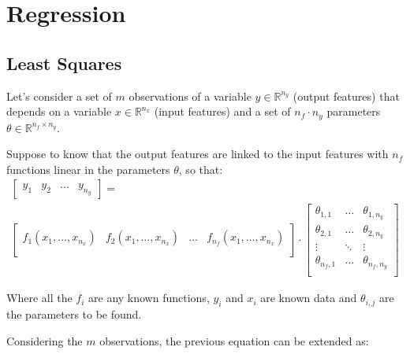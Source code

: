 \section{Regression}
\label{sec:Regression}


\subsection{Least Squares}
\label{subsec:LS}

Let's consider a set of $m$ observations of a variable $y \in \mathbb{R}^{n_y}$ (output features) that depends on a variable $x \in \mathbb{R}^{n_x}$ (input features) and a set of $n_f \cdot n_y$ parameters $\theta \in \mathbb{R}^{n_f \times n_y}$.

Suppose to know that the output features are linked to the input features with $n_f$ functions linear in the parameters $\theta$, so that:
\begin{multline*}
    \begin{bmatrix}
        y_1 & y_2 & \dots & y_{n_y} 
    \end{bmatrix}
    =\\
        \begin{bmatrix}
            f_1(x_1, \dots, x_{n_x}) & f_2(x_1, \dots, x_{n_x}) & \dots & f_{n_f}(x_1, \dots, x_{n_x}) \\
        \end{bmatrix}
        \cdot
        \begin{bmatrix}
            \theta_{1,1}  & \dots & \theta_{1,n_y} \\
            \theta_{2,1}  & \dots & \theta_{2,n_y} \\
            \vdots & \ddots & \vdots \\
            \theta_{n_f,1}  & \dots & \theta_{n_f,n_y} \\
        \end{bmatrix}
\end{multline*}

Where all the $f_i$ are any known functions, $y_i$ and $x_i$ are known data and $\theta_{i,j}$ are the parameters to be found.

Considering the $m$ observations, the previous equation can be extended as:


